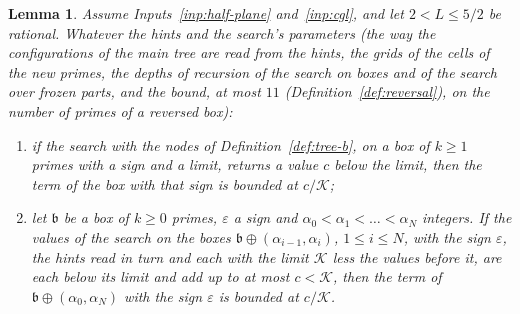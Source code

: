 \documentclass[11pt]{article}
\newtheorem{lemma}[theorem]{Lemma}
\theoremstyle{definition}
\begin{document}
\begin{lemma}\label{lem:search-b}
Assume Inputs~\ref{inp:half-plane} and~\ref{inp:cgl}, and let $2 < L \le 5/2$ be rational. Whatever the hints and the
search's parameters (the way the configurations of the main tree are read from the hints, the grids of the cells of
the new primes, the depths of recursion of the search on boxes and of the search over frozen parts, and the bound, at
most $11$ (Definition~\ref{def:reversal}), on the number of primes of a reversed box):
\begin{enumerate}
\item[(a)] if the search with the nodes of Definition~\ref{def:tree-b}, on a box of $k \ge 1$ primes with a sign and a
  limit, returns a value $c$ below the limit, then the term of the box with that sign is bounded at $c/\mathcal K$;
\item[(b)] let $\mathfrak b$ be a box of $k \ge 0$ primes, $\varepsilon$ a sign and $\alpha_0 < \alpha_1 < \dots <
  \alpha_N$ integers. If the values of the search on the boxes $\mathfrak b \oplus (\alpha_{i - 1}, \alpha_i)$,
  $1 \le i \le N$, with the sign $\varepsilon$, the hints read in turn and each with the limit $\mathcal K$ less
  the values before it, are each below its limit and add up to at most $c < \mathcal K$, then the term of $\mathfrak b
  \oplus (\alpha_0, \alpha_N)$ with the sign $\varepsilon$ is bounded at $c/\mathcal K$.
\end{enumerate}
\end{lemma}
\end{document}
